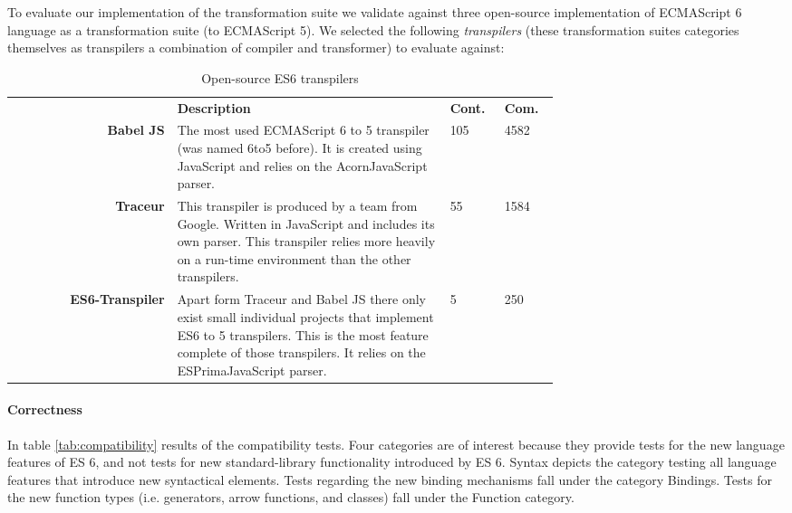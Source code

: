 To evaluate our implementation of the transformation suite we validate against three open-source implementation of ECMAScript 6 language as a transformation suite (to ECMAScript 5). We selected the following \textit{transpilers} (these transformation suites categories themselves as transpilers a combination of compiler and transformer) to evaluate against:

\begin{table}[h]
\def\arraystretch{1.5}
\caption{Open-source ES6 transpilers}
\label{transpilers}
\begin{tabular}{rp{0.5\linewidth}p{0.1\linewidth}p{0.1\linewidth}}
 & \textbf{Description} & \textbf{Cont.} & \textbf{Com.} \\
{\bf Babel JS\footnotemark[1]} & The most used ECMAScript 6 to 5 transpiler (was named 6to5 before). It is created using JavaScript and relies on the Acorn\footnotemark[4] JavaScript parser. & 105 & 4582 \\
{\bf Traceur\footnotemark[2]} & This transpiler is produced by a team from Google. Written in JavaScript and includes its own parser. This transpiler relies more heavily on a run-time environment than the other transpilers. & 55 & 1584\\
{\bf ES6-Transpiler\footnotemark[3]} & Apart form Traceur and Babel JS there only exist small individual projects that implement ES6 to 5 transpilers. This is the most feature complete of those transpilers. It relies on the ESPrima\footnotemark[5] JavaScript parser. & 5 & 250 \\
\end{tabular}
\end{table}

\paragraph{Correctness} \label{sec:correctness}
In table \ref{tab:compatibility} results of the compatibility tests. Four categories are of interest because they provide tests for the new language features of ES 6, and not tests for new standard-library functionality introduced by ES 6. Syntax depicts the category testing all language features that introduce new syntactical elements. Tests regarding the new binding mechanisms fall under the category Bindings. Tests for the new function types (i.e. generators, arrow functions, and classes) fall under the Function category. 

